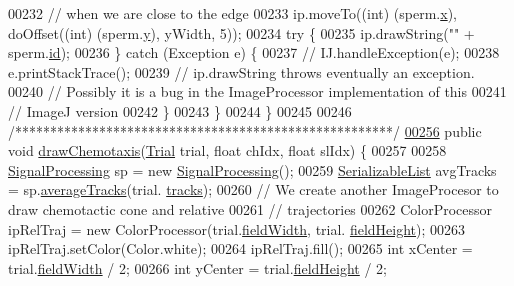\begin{DoxyCode}
00232       \textcolor{comment}{// when we are close to the edge}
00233       ip.moveTo((\textcolor{keywordtype}{int}) (sperm.\hyperlink{classdata_1_1_spermatozoon_ad0da36b2558901e21e7a30f6c227a45e}{x}), doOffset((\textcolor{keywordtype}{int}) (sperm.\hyperlink{classdata_1_1_spermatozoon_aa4f0d3eebc3c443f9be81bf48561a217}{y}), yWidth, 5));
00234       \textcolor{keywordflow}{try} \{
00235         ip.drawString(\textcolor{stringliteral}{""} + sperm.\hyperlink{classdata_1_1_spermatozoon_a76010eef1edc0406cc2375c25d2a433d}{id});
00236       \} \textcolor{keywordflow}{catch} (Exception e) \{
00237 \textcolor{comment}{//        IJ.handleException(e);}
00238         e.printStackTrace();
00239         \textcolor{comment}{// ip.drawString throws eventually an exception.}
00240         \textcolor{comment}{// Possibly it is a bug in the ImageProcessor implementation of this}
00241         \textcolor{comment}{// ImageJ version}
00242       \}
00243     \}
00244   \}
00245 
00246   \textcolor{comment}{/******************************************************/}
\hypertarget{_paint_8java_source_l00256}{}\hyperlink{classfunctions_1_1_paint_a21dbba9326aa66f10d1dfccb836c14d9}{00256}   \textcolor{keyword}{public} \textcolor{keywordtype}{void} \hyperlink{classfunctions_1_1_paint_a21dbba9326aa66f10d1dfccb836c14d9}{drawChemotaxis}(\hyperlink{classdata_1_1_trial}{Trial} trial, \textcolor{keywordtype}{float} chIdx, \textcolor{keywordtype}{float} slIdx) \{
00257 
00258     \hyperlink{classfunctions_1_1_signal_processing}{SignalProcessing} sp = \textcolor{keyword}{new} \hyperlink{classfunctions_1_1_signal_processing}{SignalProcessing}();
00259     \hyperlink{classdata_1_1_serializable_list}{SerializableList} avgTracks = sp.\hyperlink{classfunctions_1_1_signal_processing_abf1074d52caa632088bc9c8f12f8ee53}{averageTracks}(trial.
      \hyperlink{classdata_1_1_trial_ab0c3156759c41236f7f0bc83e1e5ef8f}{tracks});
00260     \textcolor{comment}{// We create another ImageProcesor to draw chemotactic cone and relative}
00261     \textcolor{comment}{// trajectories}
00262     ColorProcessor ipRelTraj = \textcolor{keyword}{new} ColorProcessor(trial.\hyperlink{classdata_1_1_trial_abce721f4aa25ad8ba8181de990a78b73}{fieldWidth}, trial.
      \hyperlink{classdata_1_1_trial_ab4aa79eade248fcf045b32ff9f11ca8b}{fieldHeight});
00263     ipRelTraj.setColor(Color.white);
00264     ipRelTraj.fill();
00265     \textcolor{keywordtype}{int} xCenter = trial.\hyperlink{classdata_1_1_trial_abce721f4aa25ad8ba8181de990a78b73}{fieldWidth} / 2;
00266     \textcolor{keywordtype}{int} yCenter = trial.\hyperlink{classdata_1_1_trial_ab4aa79eade248fcf045b32ff9f11ca8b}{fieldHeight} / 2;

\end{DoxyCode}
